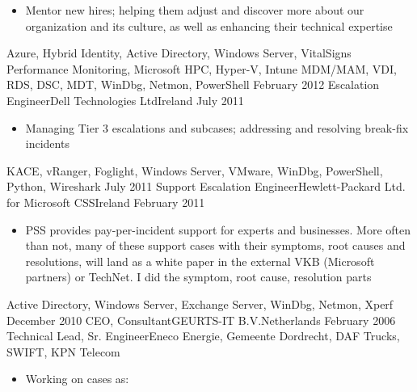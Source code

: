 \begin{experiences}
{\begin{itemize}
                        \item Mentor new hires; helping them adjust and discover more about our organization and its culture, as well as enhancing their technical expertise
                      \end{itemize}
                    }
                    {Azure, Hybrid Identity, Active Directory, Windows Server, VitalSigns Performance Monitoring, Microsoft HPC, Hyper-V, Intune MDM/MAM, VDI, RDS, DSC, MDT, WinDbg, Netmon, PowerShell}
  \emptySeparator
  \experience
  {February 2012}   {Escalation Engineer}{Dell Technologies Ltd}{Ireland}
  {July 2011}       {
                      \begin{itemize}
                        \item Managing Tier 3 escalations and subcases; addressing and resolving break-fix incidents                                
                      \end{itemize}
                    }
                    {KACE, vRanger, Foglight, Windows Server, VMware, WinDbg, PowerShell, Python, Wireshark}
  \emptySeparator
  \experience
  {July 2011}       {Support Escalation Engineer}{Hewlett-Packard Ltd. for Microsoft CSS}{Ireland}
  {February 2011}   {                    
                      \begin{itemize}
                        \item PSS provides pay-per-incident support for experts and businesses. More often than not, many of these support cases with their symptoms, root causes and resolutions, will land as a white paper in the external VKB (Microsoft partners) or TechNet. I did the symptom, root cause, resolution parts                                        
                      \end{itemize}
                    }
                    {Active Directory, Windows Server, Exchange Server, WinDbg, Netmon, Xperf}
  \emptySeparator   
  \consultantexperience
  {December 2010}   {CEO, Consultant}{GEURTS-IT B.V.}{Netherlands}
  {February 2006}   {Technical Lead, Sr. Engineer}{Eneco Energie, Gemeente Dordrecht, DAF Trucks, SWIFT, KPN Telecom}
                    {
                      \begin{itemize}
                        \item Working on cases as:
                        

\end{itemize}}
\end{experiences}
